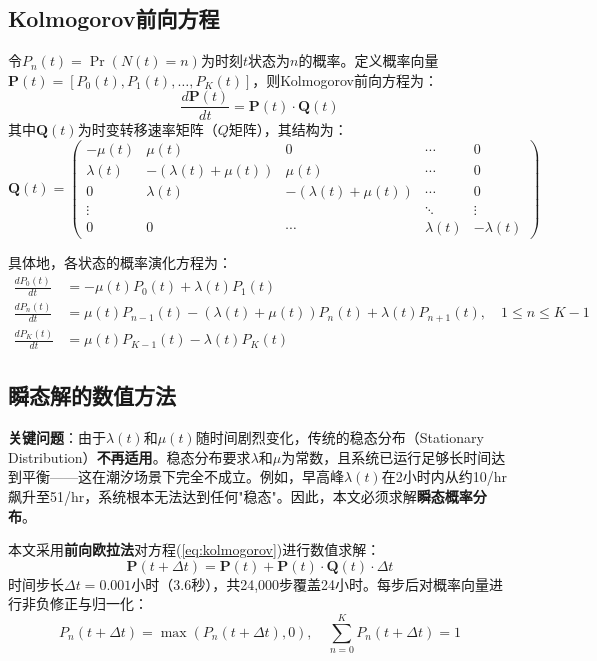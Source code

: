 \documentclass[12pt,a4paper]{article}
\begin{document}
\subsection{Kolmogorov前向方程}

令$P_n(t) = \Pr(N(t) = n)$为时刻$t$状态为$n$的概率。定义概率向量$\mathbf{P}(t) = [P_0(t), P_1(t), \ldots, P_K(t)]$，则Kolmogorov前向方程为：
\begin{equation}
\frac{d\mathbf{P}(t)}{dt} = \mathbf{P}(t) \cdot \mathbf{Q}(t)
\label{eq:kolmogorov}
\end{equation}
其中$\mathbf{Q}(t)$为时变转移速率矩阵（$Q$矩阵），其结构为：
\begin{equation}
\mathbf{Q}(t) = \begin{pmatrix}
-\mu(t) & \mu(t) & 0 & \cdots & 0 \\
\lambda(t) & -(\lambda(t)+\mu(t)) & \mu(t) & \cdots & 0 \\
0 & \lambda(t) & -(\lambda(t)+\mu(t)) & \cdots & 0 \\
\vdots & & & \ddots & \vdots \\
0 & 0 & \cdots & \lambda(t) & -\lambda(t)
\end{pmatrix}
\label{eq:Q_matrix}
\end{equation}

具体地，各状态的概率演化方程为：
\begin{align}
\frac{dP_0(t)}{dt} &= -\mu(t) P_0(t) + \lambda(t) P_1(t)  \\
\frac{dP_n(t)}{dt} &= \mu(t) P_{n-1}(t) - (\lambda(t) + \mu(t)) P_n(t) + \lambda(t) P_{n+1}(t), \quad 1 \le n \le K-1  \\
\frac{dP_K(t)}{dt} &= \mu(t) P_{K-1}(t) - \lambda(t) P_K(t)
\end{align}

\subsection{瞬态解的数值方法}

\textbf{关键问题}：由于$\lambda(t)$和$\mu(t)$随时间剧烈变化，传统的稳态分布（Stationary Distribution）\textbf{不再适用}。稳态分布要求$\lambda$和$\mu$为常数，且系统已运行足够长时间达到平衡——这在潮汐场景下完全不成立。例如，早高峰$\lambda(t)$在2小时内从约10/hr飙升至51/hr，系统根本无法达到任何"稳态"。因此，本文必须求解\textbf{瞬态概率分布}。

本文采用\textbf{前向欧拉法}对方程(\ref{eq:kolmogorov})进行数值求解：
\begin{equation}
\mathbf{P}(t+\Delta t) = \mathbf{P}(t) + \mathbf{P}(t) \cdot \mathbf{Q}(t) \cdot \Delta t
\end{equation}
时间步长$\Delta t = 0.001$小时（3.6秒），共24,000步覆盖24小时。每步后对概率向量进行非负修正与归一化：
\begin{equation}
P_n(t+\Delta t) = \max(P_n(t+\Delta t), 0), \quad \sum_{n=0}^{K} P_n(t+\Delta t) = 1
\end{equation}
\end{document}

